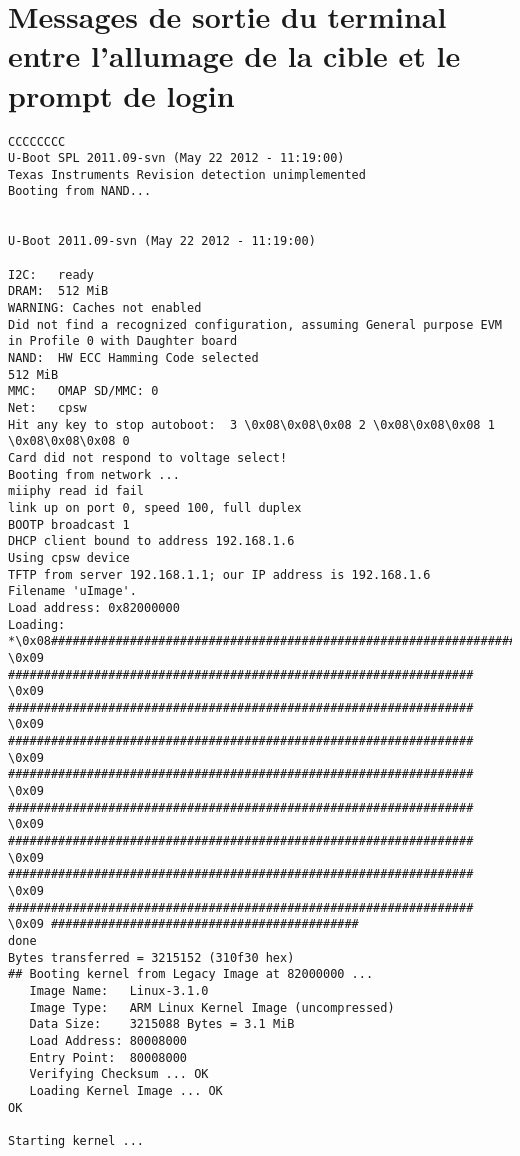 \documentclass[a4paper,12pt]{report}
\begin{document}
\chapter{Messages de sortie du terminal entre l'allumage de la cible et le prompt de login}
\begin{lstlisting}[caption=Messages de sortie du terminal entre l'allumage de la cible et le prompt de login, label=message_sortie]
CCCCCCCC
U-Boot SPL 2011.09-svn (May 22 2012 - 11:19:00)
Texas Instruments Revision detection unimplemented
Booting from NAND...


U-Boot 2011.09-svn (May 22 2012 - 11:19:00)

I2C:   ready
DRAM:  512 MiB
WARNING: Caches not enabled
Did not find a recognized configuration, assuming General purpose EVM in Profile 0 with Daughter board
NAND:  HW ECC Hamming Code selected
512 MiB
MMC:   OMAP SD/MMC: 0
Net:   cpsw
Hit any key to stop autoboot:  3 \0x08\0x08\0x08 2 \0x08\0x08\0x08 1 \0x08\0x08\0x08 0 
Card did not respond to voltage select!
Booting from network ...
miiphy read id fail
link up on port 0, speed 100, full duplex
BOOTP broadcast 1
DHCP client bound to address 192.168.1.6
Using cpsw device
TFTP from server 192.168.1.1; our IP address is 192.168.1.6
Filename 'uImage'.
Load address: 0x82000000
Loading: *\0x08#################################################################
\0x09 #################################################################
\0x09 #################################################################
\0x09 #################################################################
\0x09 #################################################################
\0x09 #################################################################
\0x09 #################################################################
\0x09 #################################################################
\0x09 #################################################################
\0x09 ###########################################
done
Bytes transferred = 3215152 (310f30 hex)
## Booting kernel from Legacy Image at 82000000 ...
   Image Name:   Linux-3.1.0
   Image Type:   ARM Linux Kernel Image (uncompressed)
   Data Size:    3215088 Bytes = 3.1 MiB
   Load Address: 80008000
   Entry Point:  80008000
   Verifying Checksum ... OK
   Loading Kernel Image ... OK
OK

Starting kernel ...


\end{lstlisting}
\end{document}
